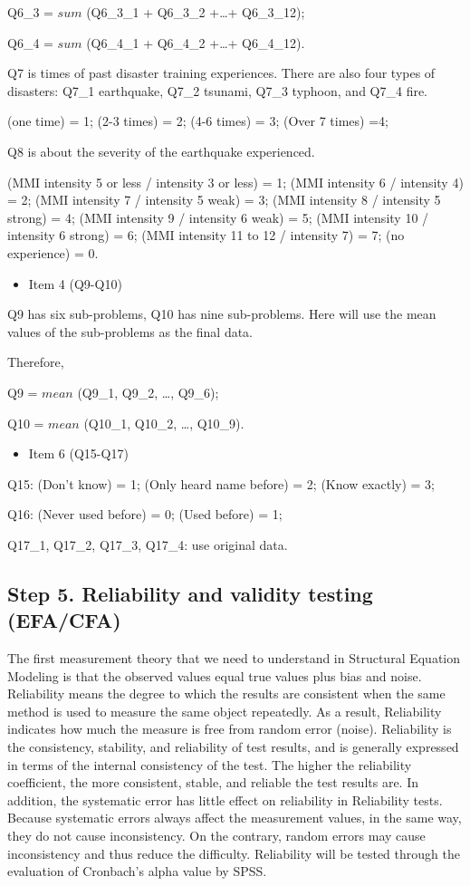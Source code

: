 Q6\_3 = $sum$ (Q6\_3\_1 + Q6\_3\_2 +\dots+ Q6\_3\_12);

Q6\_4 = $sum$ (Q6\_4\_1 + Q6\_4\_2 +\dots+ Q6\_4\_12).

Q7 is times of past disaster training experiences. There are also four types of disasters: Q7\_1 earthquake, Q7\_2 tsunami, Q7\_3 typhoon, and Q7\_4 fire.
 
(one time) = 1; (2-3 times) = 2; (4-6 times) = 3; (Over 7 times) =4;

Q8 is about the severity of the earthquake experienced.

(MMI intensity 5 or less / intensity 3 or less) = 1; (MMI intensity 6 / intensity 4) = 2; (MMI intensity 7 / intensity 5 weak) = 3; (MMI intensity 8 / intensity 5 strong) = 4; (MMI intensity 9 / intensity 6 weak) = 5; (MMI intensity 10 / intensity 6 strong) = 6; (MMI intensity 11 to 12 / intensity 7) = 7; (no experience) = 0.


\begin{itemize}
\item Item 4 (Q9-Q10)
\end{itemize}

Q9 has six sub-problems, Q10 has nine sub-problems. Here will use the mean values of the sub-problems as the final data. 

Therefore, 

Q9 = $mean$ (Q9\_1, Q9\_2, \dots, Q9\_6);

Q10 = $mean$ (Q10\_1, Q10\_2, \dots, Q10\_9).

\begin{itemize}
\item Item 6 (Q15-Q17)
\end{itemize}

Q15: (Don't know) = 1; (Only heard name before) = 2; (Know exactly) = 3;

Q16: (Never used before) = 0; (Used before) = 1;
 
Q17\_1, Q17\_2, Q17\_3, Q17\_4: use original data.

\subsection{Step 5. Reliability and validity testing (EFA/CFA)}

The first measurement theory that we need to understand in Structural Equation Modeling is that the observed values equal true values plus bias and noise. Reliability means the degree to which the results are consistent when the same method is used to measure the same object repeatedly. As a result, Reliability indicates how much the measure is free from random error (noise). Reliability is the consistency, stability, and reliability of test results, and is generally expressed in terms of the internal consistency of the test. The higher the reliability coefficient, the more consistent, stable, and reliable the test results are. In addition, the systematic error has little effect on reliability in Reliability tests. Because systematic errors always affect the measurement values, in the same way, they do not cause inconsistency. On the contrary, random errors may cause inconsistency and thus reduce the difficulty. Reliability will be tested through the evaluation of Cronbach's alpha value by SPSS. 

